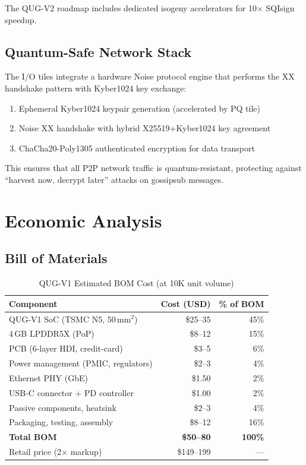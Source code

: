 \documentclass[11pt,a4paper]{article}
\begin{document}
The QUG-V2 roadmap includes dedicated isogeny accelerators for 10$\times$ SQIsign speedup.

\subsection{Quantum-Safe Network Stack}

The I/O tiles integrate a hardware Noise protocol engine that performs the XX handshake pattern with Kyber1024 key exchange:

\begin{enumerate}
    \item Ephemeral Kyber1024 keypair generation (accelerated by PQ tile)
    \item Noise XX handshake with hybrid X25519+Kyber1024 key agreement
    \item ChaCha20-Poly1305 authenticated encryption for data transport
\end{enumerate}

This ensures that all P2P network traffic is quantum-resistant, protecting against ``harvest now, decrypt later'' attacks on gossipsub messages.

\section{Economic Analysis}
\label{sec:economics}

\subsection{Bill of Materials}

\begin{table}[H]
\centering
\caption{QUG-V1 Estimated BOM Cost (at 10K unit volume)}
\label{tab:bom}
\begin{tabular}{@{}lrr@{}}
\toprule
\textbf{Component} & \textbf{Cost (USD)} & \textbf{\% of BOM} \\
\midrule
QUG-V1 SoC (TSMC N5, 50\,mm$^2$) & \$25--35 & 45\% \\
4\,GB LPDDR5X (PoP) & \$8--12 & 15\% \\
PCB (6-layer HDI, credit-card) & \$3--5 & 6\% \\
Power management (PMIC, regulators) & \$2--3 & 4\% \\
Ethernet PHY (GbE) & \$1.50 & 2\% \\
USB-C connector + PD controller & \$1.00 & 2\% \\
Passive components, heatsink & \$2--3 & 4\% \\
Packaging, testing, assembly & \$8--12 & 16\% \\
\midrule
\textbf{Total BOM} & \textbf{\$50--80} & \textbf{100\%} \\
\midrule
Retail price (2$\times$ markup) & \$149--199 & --- \\
\bottomrule
\end{tabular}
\end{table}
\end{document}
